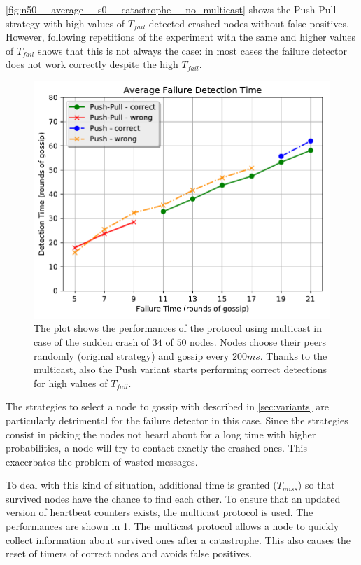 \cref{fig:n50__average__s0__catastrophe__no_multicast} shows the Push-Pull strategy with high values of $T_{fail}$ detected crashed nodes without false positives. However, following repetitions of the experiment with the same and higher values of $T_{fail}$ shows that this is not always the case:
in most cases the failure detector does not work correctly despite the high $T_{fail}$.

\begin{figure}[t]
	\centering
	\includegraphics[width=\columnwidth]{figures/n50__average__s0__catastrophe__multicast}
	\caption{The plot shows the performances of the protocol using multicast in case of the sudden crash of $34$ of $50$ nodes. Nodes choose their peers randomly (original strategy) and gossip every $200 \si{ms}$. Thanks to the multicast, also the Push variant starts performing correct detections for high values of $T_{fail}$.}
	\label{fig:n50__average__s0__catastrophe__multicast}
\end{figure}

The strategies to select a node to gossip with described in \cref{sec:variants} are particularly detrimental for the failure detector in this case.
Since the strategies consist in picking the nodes not heard about for a long time with higher probabilities, a node will try to contact exactly the crashed ones. This exacerbates the problem of wasted messages.

To deal with this kind of situation, additional time is granted ($T_{miss}$) so that survived nodes have the chance to find each other.
To ensure that an updated version of heartbeat counters exists, the multicast protocol is used.
The performances are shown in \cref{fig:n50__average__s0__catastrophe__multicast}.
The multicast protocol allows a node to quickly collect information about survived ones after a catastrophe.
This also causes the reset of timers of correct nodes and avoids false positives.

